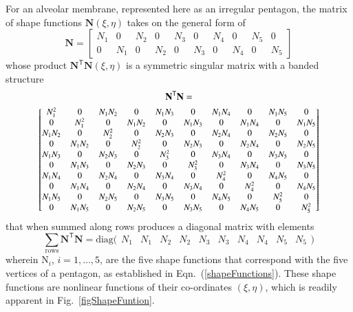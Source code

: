 For an alveolar membrane, represented here as an irregular pentagon, the matrix of shape functions $\mathbf{N}(\xi,\eta)$ takes on the general form of
\begin{equation}
\mathbf{N} = 
\begin{bmatrix}
N_1 & 0 & N_2 & 0 & N_3 & 0 & N_4 & 0 & N_5 & 0 \\ 
0 & N_1 & 0 & N_2 & 0 & N_3 & 0 & N_4 & 0 & N_5 
\end{bmatrix} 
\label{shape2D}
\end{equation}
whose product $\mathbf{N}^{\mathsf{T}}\mathbf{N}(\xi,\eta)$ is a symmetric singular matrix with a banded structure
\begin{multline}
     \mathbf{N}^{\mathsf{T}} \mathbf{N} = \\ \footnotesize \begin{bmatrix}
     N_1^2 & 0 & N_1 N_2 & 0 & N_1 N_3 & 0 & N_1 N_4 & 0 & N_1 N_5 & 0 \\
     0 & N_1^2 & 0 & N_1 N_2 & 0 & N_1 N_3 & 0 & N_1 N_4 & 0 & N_1 N_5 \\
     N_1 N_2 & 0 & N_2^2 & 0 & N_2 N_3 & 0 & N_2 N_4 & 0 & N_2 N_5 & 0 \\
     0 & N_1 N_2 & 0 & N_2^2 & 0 & N_2 N_3 & 0 & N_2 N_4 & 0 & N_2 N_5 \\
     N_1 N_3 & 0 & N_2 N_3 & 0 & N_3^2 & 0 & N_3 N_4 & 0 & N_3 N_5 & 0 \\
     0 & N_1 N_3 & 0 & N_2 N_3 & 0 & N_3^2 & 0 & N_3 N_4 & 0 & N_3 N_5 \\
     N_1 N_4 & 0 & N_2 N_4 & 0 & N_3 N_4 & 0 & N_4^2 & 0 & N_4 N_5 & 0 \\
     0 & N_1 N_4 & 0 & N_2 N_4 & 0 & N_3 N_4 & 0 & N_4^2 & 0 & N_4 N_5 \\
     N_1 N_5 & 0 & N_2 N_5 & 0 & N_3 N_5 & 0 & N_4 N_5 & 0 & N_5^2 & 0 \\
     0 & N_1 N_5 & 0 & N_2 N_5 & 0 & N_3 N_5 & 0 & N_4 N_5 & 0 & N_5^2
     \end{bmatrix}
\end{multline}
\normalsize
that when summed along rows produces a diagonal matrix with elements
\begin{equation}
    \sum_{\mathrm{rows}} \mathbf{N}^{\mathsf{T}} \mathbf{N} = 
    \mathrm{diag} \bigl( \begin{matrix}
    N_1 & N_1 & N_2 & N_2 & N_3 & N_3 & N_4 & N_4 & N_5 & N_5
    \end{matrix} \bigr)
\end{equation}
wherein $\mathrm{N}_i$, $i = 1, \ldots, 5$, are the five shape functions that correspond with the five vertices of a pentagon, as established in Eqn.~(\ref{shapeFunctions}).  These shape functions are nonlinear functions of their co-ordinates $(\xi,\eta)$, which is readily apparent in Fig.~\ref{figShapeFuntion}.


